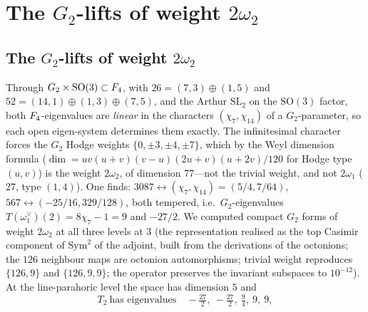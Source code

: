 \documentclass[11pt]{amsart}
\theoremstyle{definition}
\begin{document}
\section{The $G_2$-lifts of weight $2\omega_2$}
\subsection{The $G_2$-lifts of weight $2\omega_2$}\label{sec:g2lift} Through $G_2\times\mathrm{SO}(3)\subset F_4$, with $26=(7,3)\oplus(1,5)$ and $52=(14,1)\oplus(1,3)\oplus(7,5)$, and the Arthur $\mathrm{SL}_2$ on the $\mathrm{SO}(3)$ factor, both $F_4$-eigenvalues are \emph{linear} in the characters $(\chi_7,\chi_{14})$ of a $G_2$-parameter, so each open eigen-system determines them exactly. The infinitesimal character forces the $G_2$ Hodge weights $\{0,\pm3,\pm4,\pm7\}$, which by the Weyl dimension formula ($\dim=uv(u+v)(v-u)(2u+v)(u+2v)/120$ for Hodge type $(u,v)$) is the weight $2\omega_2$, of dimension $77$---not the trivial weight, and not $2\omega_1$ ($27$, type $(1,4)$). One finds: $3087\leftrightarrow(\chi_7,\chi_{14})=(5/4,7/64)$, $567\leftrightarrow(-25/16,329/128)$, both tempered, i.e.\ $G_2$-eigenvalues $T(\omega_1^\vee)(2)=8\chi_7-1=9$ and $-27/2$. We computed compact $G_2$ forms of weight $2\omega_2$ at all three levels at $3$ (the representation realised as the top Casimir component of $\mathrm{Sym}^2$ of the adjoint, built from the derivations of the octonions; the $126$ neighbour maps are octonion automorphisms; trivial weight reproduces $\{126,9\}$ and $\{126,9,9\}$; the operator preserves the invariant subspaces to $10^{-12}$). At the line-parahoric level the space has dimension $5$ and
\[T_2\ \text{has eigenvalues}\quad -\tfrac{27}2,\ -\tfrac{27}2,\ \tfrac94,\ 9,\ 9,\]
\end{document}
